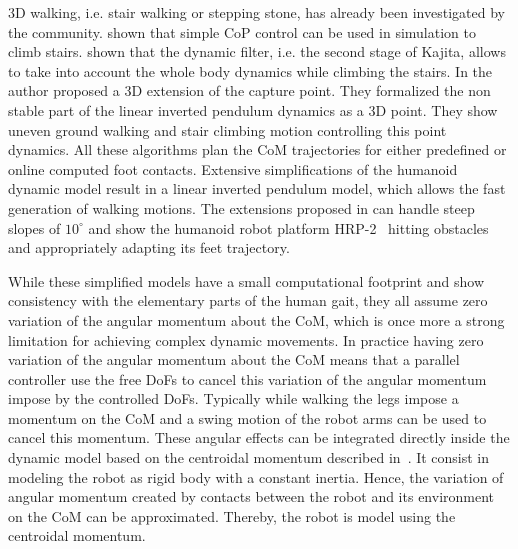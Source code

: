 3D walking, i.e. stair walking or stepping stone, has already been investigated by the community.
\cite{Kajita:icra:2003} shown that simple CoP control can be used in simulation to climb stairs.
\cite{naveau:ichr:2014} shown that the dynamic filter, i.e. the second stage of Kajita, allows to take into account the whole body dynamics while climbing the stairs.
In \cite{englsberger:iros:2015} the author proposed a 3D extension of the capture point.
They formalized the non stable part of the linear inverted pendulum dynamics as a 3D point.
They show uneven ground walking and stair climbing motion controlling this point dynamics.
All these algorithms plan the CoM trajectories for either predefined or online computed foot contacts.
Extensive simplifications of the humanoid dynamic model result in a linear inverted pendulum model, which allows the fast generation of walking motions.
The extensions proposed in \cite{Nishiwaki:IJRR:2012} can handle steep slopes of $10^\circ$ and show the humanoid robot platform HRP-2~\cite{Kaneko2004} hitting obstacles and appropriately adapting its feet trajectory.

While these simplified models have a small computational footprint and show consistency with the elementary parts of the human gait, they all assume zero variation of the angular momentum about the CoM, which is once more a strong limitation for achieving complex dynamic movements.
In practice having zero variation of the angular momentum about the CoM means that a parallel controller use the free DoFs to cancel this variation of the angular momentum impose by the controlled DoFs.
Typically while walking the legs impose a momentum on the CoM and a swing motion of the robot arms can be used to cancel this momentum.
These angular effects can be integrated directly inside the dynamic model based on the centroidal momentum described in~\cite{Orin:autorob:2013}.
It consist in modeling the robot as rigid body with a constant inertia.
Hence, the variation of angular momentum created by contacts between the robot and its environment on the CoM can be approximated.
Thereby, the robot is model using the centroidal momentum.
%
%
%

